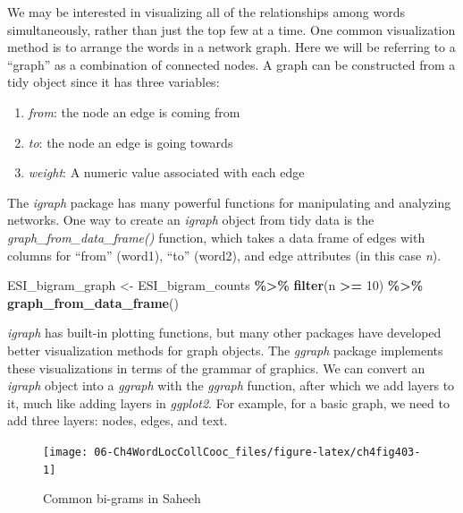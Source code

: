 \documentclass[
]{article}
\newenvironment{Shaded}{\begin{snugshade}}{\end{snugshade}}
\newcommand{\DecValTok}[1]{\textcolor[rgb]{0.00,0.00,0.81}{#1}}
\newcommand{\FunctionTok}[1]{\textcolor[rgb]{0.13,0.29,0.53}{\textbf{#1}}}
\newcommand{\NormalTok}[1]{#1}
\newcommand{\OtherTok}[1]{\textcolor[rgb]{0.56,0.35,0.01}{#1}}
\newcommand{\SpecialCharTok}[1]{\textcolor[rgb]{0.81,0.36,0.00}{\textbf{#1}}}
\providecommand{\tightlist}{%
  \setlength{\itemsep}{0pt}\setlength{\parskip}{0pt}}
\begin{document}
We may be interested in visualizing all of the relationships among words simultaneously, rather than just the top few at a time. One common visualization method is to arrange the words in a network graph. Here we will be referring to a ``graph'' as a combination of connected nodes. A graph can be constructed from a tidy object since it has three variables:

\begin{enumerate}
\def\labelenumi{\arabic{enumi}.}
\tightlist
\item
  \emph{from}: the node an edge is coming from
\item
  \emph{to}: the node an edge is going towards
\item
  \emph{weight}: A numeric value associated with each edge
\end{enumerate}

The \emph{igraph} package has many powerful functions for manipulating and analyzing networks. One way to create an \emph{igraph} object from tidy data is the \emph{graph\_from\_data\_frame()} function, which takes a data frame of edges with columns for ``from'' (word1), ``to'' (word2), and edge attributes (in this case \emph{n}).

\footnotesize

\begin{Shaded}
\begin{Highlighting}[]
\NormalTok{ESI\_bigram\_graph }\OtherTok{\textless{}{-}}\NormalTok{ ESI\_bigram\_counts }\SpecialCharTok{\%\textgreater{}\%}
                      \FunctionTok{filter}\NormalTok{(n }\SpecialCharTok{\textgreater{}=} \DecValTok{10}\NormalTok{) }\SpecialCharTok{\%\textgreater{}\%}
                      \FunctionTok{graph\_from\_data\_frame}\NormalTok{()}
\end{Highlighting}
\end{Shaded}

\normalsize

\emph{igraph} has built-in plotting functions, but many other packages have developed better visualization methods for graph objects. The \emph{ggraph} package \citep{ggraph} implements these visualizations in terms of the grammar of graphics. We can convert an \emph{igraph} object into a \emph{ggraph} with the \emph{ggraph} function, after which we add layers to it, much like adding layers in \emph{ggplot2}. For example, for a basic graph, we need to add three layers: nodes, edges, and text.

\begin{figure}

{\centering \texttt{[image: 06-Ch4WordLocCollCooc\_files/figure-latex/ch4fig403-1]} 

}

\caption{Common bi-grams in Saheeh}\label{fig:ch4fig403}
\end{figure}
\end{document}
